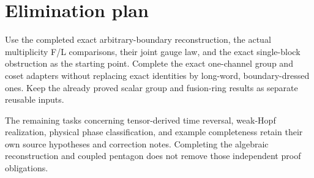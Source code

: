 \documentclass{article}
\begin{document}
\section{Elimination plan}

Use the completed exact arbitrary-boundary reconstruction, the actual
multiplicity F/L comparisons, their joint gauge law, and the exact
single-block obstruction as the starting point.
Complete the exact one-channel group and coset adapters without replacing
exact identities by long-word, boundary-dressed ones. Keep the already
proved scalar group and fusion-ring results as separate reusable inputs.

The remaining tasks concerning tensor-derived time reversal, weak-Hopf
realization, physical phase classification, and example completeness retain
their own source hypotheses and correction notes. Completing the algebraic reconstruction and coupled
pentagon does not remove those independent proof obligations.



\end{document}
